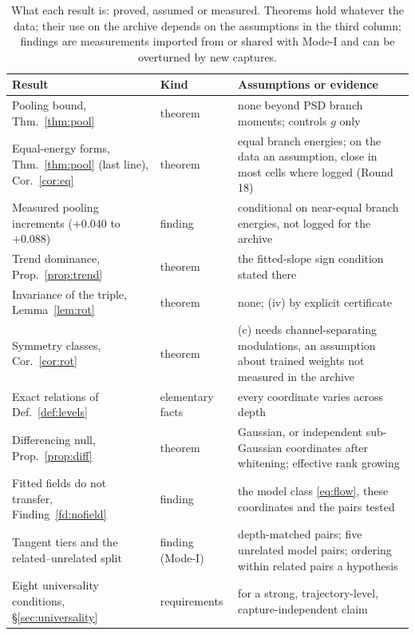 \documentclass[11pt]{article}
\theoremstyle{definition}
\begin{document}
\begin{table}[htbp]
\centering\footnotesize
\caption{What each result is: proved, assumed or measured. Theorems hold whatever the data; their use on the archive depends on the assumptions in the third column; findings are measurements imported from or shared with Mode-I and can be overturned by new captures.}
\label{tab:kinds}
\begin{tabularx}{\linewidth}{@{}>{\raggedright\arraybackslash}p{3.4cm}>{\raggedright\arraybackslash}p{1.9cm}L@{}}
\toprule
Result & Kind & Assumptions or evidence\\
\midrule
Pooling bound, Thm.~\ref{thm:pool} & theorem & none beyond PSD branch moments; controls $g$ only\\
Equal-energy forms, Thm.~\ref{thm:pool} (last line), Cor.~\ref{cor:eq} & theorem & equal branch energies; on the data an assumption, close in most cells where logged (Round 18)\\
Measured pooling increments ($+0.040$ to $+0.088$) & finding & conditional on near-equal branch energies, not logged for the archive\\
Trend dominance, Prop.~\ref{prop:trend} & theorem & the fitted-slope sign condition stated there\\
Invariance of the triple, Lemma~\ref{lem:rot} & theorem & none; (iv) by explicit certificate\\
Symmetry classes, Cor.~\ref{cor:rot} & theorem & (c) needs channel-separating modulations, an assumption about trained weights not measured in the archive\\
Exact relations of Def.~\ref{def:levels} & elementary facts & every coordinate varies across depth\\
Differencing null, Prop.~\ref{prop:diff} & theorem & Gaussian, or independent sub-Gaussian coordinates after whitening; effective rank growing\\
Fitted fields do not transfer, Finding~\ref{fd:nofield} & finding & the model class \eqref{eq:flow}, these coordinates and the pairs tested\\
Tangent tiers and the related--unrelated split & finding (Mode-I) & depth-matched pairs; five unrelated model pairs; ordering within related pairs a hypothesis\\
Eight universality conditions, \S\ref{sec:universality} & requirements & for a strong, trajectory-level, capture-independent claim\\
\bottomrule
\end{tabularx}
\end{table}
\end{document}

